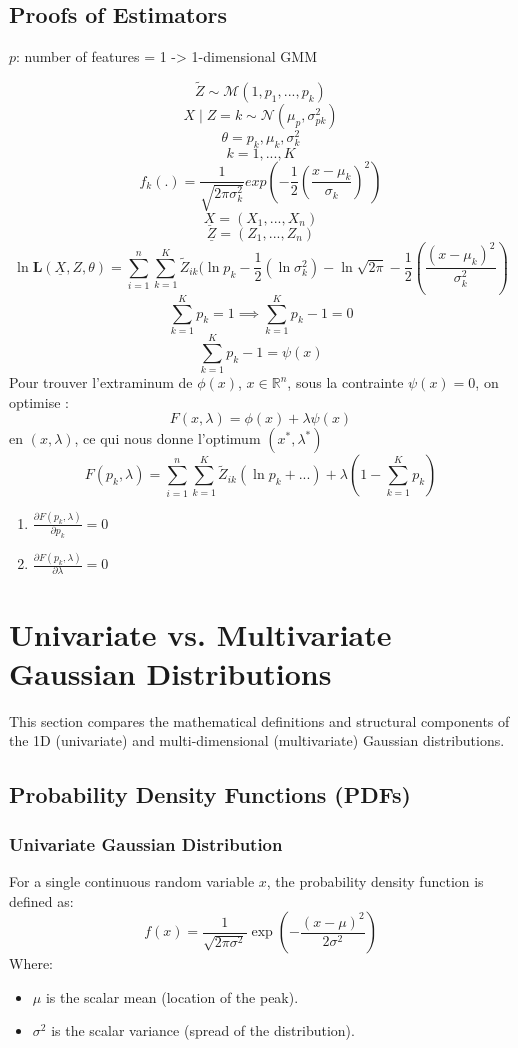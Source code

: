 \documentclass[a4paper,11pt]{article}
\begin{document}
\subsection{Proofs of Estimators}

$p$: number of features = 1 -> 1-dimensional GMM

\[
\tilde{Z} \sim \mathcal{M}(1,p_1,...,p_k)
\]
\[
X \mid Z = k \sim \mathcal{N}(\mu_p, \sigma_{pk}^2)
\]
\[
\theta = p_k, \mu_k, \sigma_k^2
\]
\[
k=1,...,K
\]
\[
f_k(.) = \frac{1}{\sqrt{2\pi\sigma_k^2}}exp(-\frac{1}{2}(\frac{x-\mu_k}{\sigma_k})^2)
\]
\[
\underline{X} = (X_1,...,X_n)
\]
\[
\underline{Z} = (Z_1,...,Z_n)
\]
\[
\ln\mathbf{L}(\underline{X}, Z, \theta) = \sum_{i=1}^{n} \sum_{k=1}^{K} \tilde{Z}_{ik}(\ln p_k -\frac{1}{2}(\ln \sigma_k^2) -\ln\sqrt{2\pi} -\frac{1}{2}(\frac{(x-\mu_k)^2}{\sigma_k^2})
\]
\[
\sum_{k=1}^K p_k = 1 \implies \sum_{k=1}^K p_k - 1 = 0
\]
\[
\sum_{k=1}^K p_k - 1 = \psi(x)
\]
Pour trouver l'extraminum de $\phi(x)$, $x \in \mathbb{R}^n$, sous la contrainte $\psi(x) = 0$, on optimise :
\[
F(x, \lambda) = \phi(x)+\lambda \psi(x)
\]
en $(x, \lambda)$, ce qui nous donne l'optimum $(x^*, \lambda^*)$
\[
F(p_k, \lambda) = \sum_{i=1}^{n} \sum_{k=1}^{K} \tilde{Z}_{ik}(\ln p_k + ...) + \lambda(1 - \sum_{k=1}^K p_k)
\]

\begin{enumerate}
	\item $\frac{\partial F(p_k, \lambda)}{\partial p_k} = 0$
	\item $\frac{\partial F(p_k, \lambda)}{\partial \lambda} = 0$
\end{enumerate}





\section{Univariate vs. Multivariate Gaussian Distributions}

This section compares the mathematical definitions and structural components of the 1D (univariate) and multi-dimensional (multivariate) Gaussian distributions.

\subsection{Probability Density Functions (PDFs)}

\subsubsection{Univariate Gaussian Distribution}
For a single continuous random variable $x$, the probability density function is defined as:
\begin{equation}
f(x) = \frac{1}{\sqrt{2\pi\sigma^2}} \exp\left( -\frac{(x - \mu)^2}{2\sigma^2} \right)
\end{equation}
Where:
\begin{itemize}
    \item $\mu$ is the scalar mean (location of the peak).
    \item $\sigma^2$ is the scalar variance (spread of the distribution).
\end{itemize}
\end{document}
